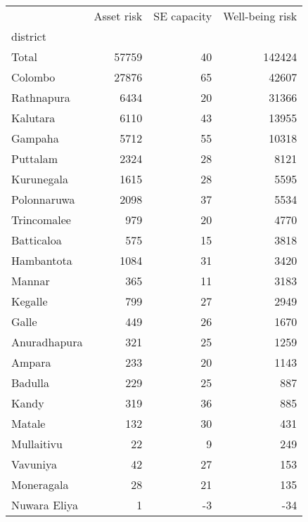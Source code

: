 \begin{tabular}{lrrr}
\toprule
{} &  Asset risk &  SE capacity &  Well-being risk \\
district     &             &              &                  \\
\midrule
Total        &       57759 &           40 &           142424 \\
Colombo      &       27876 &           65 &            42607 \\
Rathnapura   &        6434 &           20 &            31366 \\
Kalutara     &        6110 &           43 &            13955 \\
Gampaha      &        5712 &           55 &            10318 \\
Puttalam     &        2324 &           28 &             8121 \\
Kurunegala   &        1615 &           28 &             5595 \\
Polonnaruwa  &        2098 &           37 &             5534 \\
Trincomalee  &         979 &           20 &             4770 \\
Batticaloa   &         575 &           15 &             3818 \\
Hambantota   &        1084 &           31 &             3420 \\
Mannar       &         365 &           11 &             3183 \\
Kegalle      &         799 &           27 &             2949 \\
Galle        &         449 &           26 &             1670 \\
Anuradhapura &         321 &           25 &             1259 \\
Ampara       &         233 &           20 &             1143 \\
Badulla      &         229 &           25 &              887 \\
Kandy        &         319 &           36 &              885 \\
Matale       &         132 &           30 &              431 \\
Mullaitivu   &          22 &            9 &              249 \\
Vavuniya     &          42 &           27 &              153 \\
Moneragala   &          28 &           21 &              135 \\
Nuwara Eliya &           1 &           -3 &              -34 \\
\bottomrule
\end{tabular}
